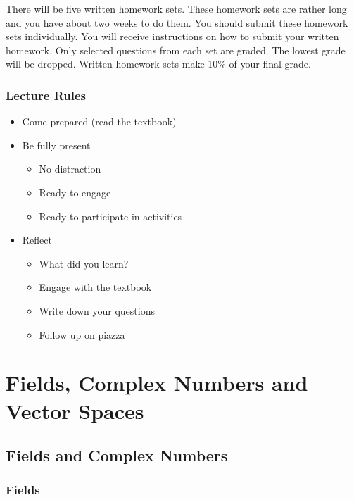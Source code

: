 \documentclass[11pt,fleqn]{book} %
\begin{document}
  There will be five written homework sets. These homework sets are rather long and you have about two weeks to do them. You should submit these homework sets individually. You will receive instructions on how to submit your written homework.  Only selected questions from each set are graded. The lowest grade will be dropped. Written homework sets make 10\% of your final grade.

\subsection{Lecture Rules}

\begin{itemize}
    \item Come prepared (read the textbook)
    \item Be fully present
    \begin{itemize}
        \item No distraction
        \item Ready to engage
        \item Ready to participate in activities
    \end{itemize}
    \item Reflect
    \begin{itemize}
        \item What did you learn?
        \item Engage with the textbook
        \item Write down your questions
        \item Follow up on piazza
    \end{itemize}
\end{itemize}


\chapter{Fields, Complex Numbers and Vector Spaces}

\section{Fields and Complex Numbers}

\subsection{Fields}
\end{document}
